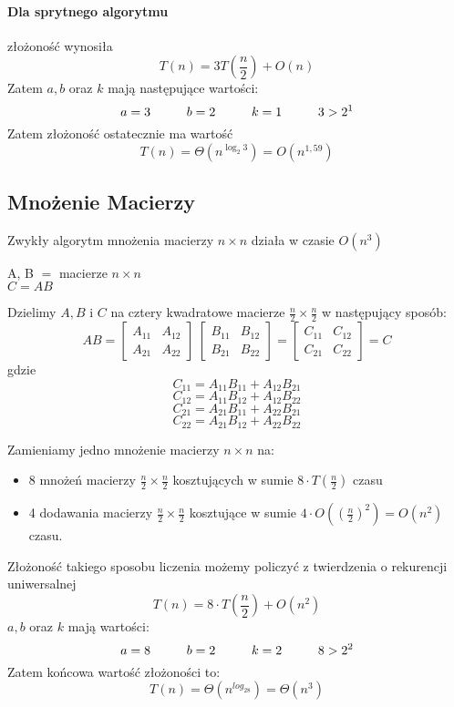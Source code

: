 \paragraph{Dla sprytnego algorytmu} złożoność wynosiła
	$$T(n) = 3T(\frac{n}{2})+O(n)$$
Zatem $a,b$ oraz $k$ mają następujące wartości:
	$$a=3 \hspace*{1cm} b=2 \hspace*{1cm} k=1 \hspace*{1cm} 3>2^1$$
Zatem złożoność ostatecznie ma wartość
	$$T(n)= \Theta(n^{\log_2 3}) = O(n^{1,59})$$

\subsection{Mnożenie Macierzy}
Zwykły algorytm mnożenia macierzy $n \times n$ działa w czasie $O(n^3)$

A, B $=$ macierze $n \times n$\\
$C = AB$ 

Dzielimy $A,B$ i $C$ na cztery kwadratowe macierze $\frac{n}{2} \times \frac{n}{2}$ w następujący sposób:
\[
AB = 
\begin{bmatrix}
    A_{11}	& A_{12} \\
    A_{21}  & A_{22} 
\end{bmatrix}\ 
\begin{bmatrix}
    B_{11}  & B_{12} \\
    B_{21}  & B_{22} 
\end{bmatrix}
=
\begin{bmatrix}
    C_{11}  & C_{12} \\
    C_{21}  & C_{22} 
\end{bmatrix} = C
\]
gdzie 
$$C_{11}= A_{11}B_{11}+A_{12}B_{21}$$
$$C_{12}= A_{11}B_{12}+A_{12}B_{22}$$
$$C_{21}= A_{21}B_{11}+A_{22}B_{21}$$
$$C_{22}= A_{21}B_{12}+A_{22}B_{22}$$

Zamieniamy jedno mnożenie macierzy $n \times n$ na:
\begin{itemize}
	\item 8 mnożeń macierzy $\frac{n}{2} \times \frac{n}{2}$ kosztujących w sumie $8 \cdot T(\frac{n}{2})$ czasu 
	\item 4 dodawania macierzy  $\frac{n}{2} \times \frac{n}{2}$ kosztujące w sumie $4 \cdot O((\frac{n}{2})^2) = O(n^2)$ czasu.
\end{itemize} 
Złożoność takiego sposobu liczenia możemy policzyć z twierdzenia o  rekurencji uniwersalnej
$$T(n)=8 \cdot T( \frac{n}{2} )+ O(n^2)$$
$a,b$ oraz $k$ mają wartości:
$$a=8 \hspace*{1cm} b=2 \hspace*{1cm} k=2 \hspace*{1cm} 8>2^2$$
Zatem końcowa wartość złożoności to:
$$T(n)=\Theta(n^{log_28}) = \Theta(n^3)$$

